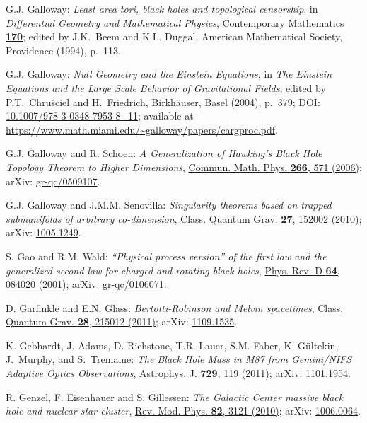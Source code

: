 \begin{thebibliography}{123}
G.J. Galloway:
{\em Least area tori, black holes and topological censorship},
in {\em Differential Geometry and Mathematical Physics},
\href{https://doi.org/10.1090/conm/170}{Contemporary Mathematics {\bf 170}};
edited by  J.K.~Beem and K.L. Duggal,
American Mathematical Society, Providence (1994), p.~113.

G.J. Galloway:
{\em Null Geometry and the Einstein Equations},
in {\em The Einstein Equations and the Large Scale Behavior of Gravitational Fields},
edited by P.T.~Chruściel and H.~Friedrich,
Birkhäuser, Basel (2004), p.~379;
DOI: \href{https://doi.org/10.1007/978-3-0348-7953-8_11}{10.1007/978-3-0348-7953-8\_11};
available at
{\small \url{https://www.math.miami.edu/~galloway/papers/cargproc.pdf}}.

G.J. Galloway and R. Schoen:
{\em A Generalization of Hawking’s Black Hole Topology Theorem to Higher Dimensions},
\href{https://doi.org/10.1007/s00220-006-0019-z}{Commun. Math. Phys. {\bf 266}, 571 (2006)};
arXiv: \href{https://arxiv.org/abs/gr-qc/0509107}{gr-qc/0509107}.

G.J. Galloway and  J.M.M. Senovilla:
{\em Singularity theorems based on trapped submanifolds of arbitrary co-dimension},
\href{https://doi.org/10.1088/0264-9381/27/15/152002}{Class. Quantum Grav. {\bf 27}, 152002 (2010)};
arXiv: \href{https://arxiv.org/abs/1005.1249}{1005.1249}.

S. Gao and R.M. Wald:
{\em ``Physical process version'' of the first law and the generalized second law for charged and rotating black holes},
\href{https://doi.org/10.1103/PhysRevD.64.084020}{Phys. Rev. D {\bf 64}, 084020 (2001)};
arXiv: \href{https://arxiv.org/abs/gr-qc/0106071}{gr-qc/0106071}.

D. Garfinkle and E.N. Glass:
{\em Bertotti-Robinson and Melvin spacetimes},
\href{https://doi.org/10.1088/0264-9381/28/21/215012}{Class. Quantum Grav. {\bf 28}, 215012 (2011)};
arXiv: \href{https://arxiv.org/abs/1109.1535}{1109.1535}.

K. Gebhardt, J. Adams, D. Richstone, T.R. Lauer, S.M. Faber, K. Gültekin, J.~Murphy, and S.~Tremaine:
{\em The Black Hole Mass in M87 from Gemini/NIFS Adaptive Optics Observations},
\href{https://doi.org/10.1088/0004-637X/729/2/119}{Astrophys. J. {\bf 729}, 119 (2011)};
arXiv: \href{https://arxiv.org/abs/1101.1954}{1101.1954}.

R. Genzel, F. Eisenhauer and S. Gillessen:
{\em The Galactic Center massive black hole and nuclear star cluster},
\href{https://doi.org/10.1103/RevModPhys.82.3121}{Rev. Mod. Phys. {\bf 82}, 3121 (2010)};
arXiv: \href{https://arxiv.org/abs/1006.0064}{1006.0064}.


\end{thebibliography}
